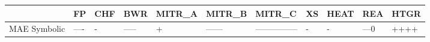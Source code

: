 \begin{tabular}{lllllllllll}
\toprule
 & FP & CHF & BWR & MITR_A & MITR_B & MITR_C & XS & HEAT & REA & HTGR \\
\midrule
MAE Symbolic & ---- & - & ----- & + & ------ & --------------- & - & - & ---0 & ++++ \\
\bottomrule
\end{tabular}
